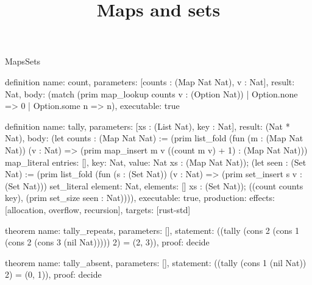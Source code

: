 \begin{lexlean}{MapsSets}
\title{Maps and sets}
\begin{semanticmodule}
definition{
  name: count,
  parameters: [counts : (Map Nat Nat), v : Nat],
  result: Nat,
  body: (match (prim map_lookup counts v : (Option Nat)) | Option.none => 0 | Option.some n => n),
  executable: true
}

definition{
  name: tally,
  parameters: [xs : (List Nat), key : Nat],
  result: (Nat * Nat),
  body: (let counts : (Map Nat Nat) := (prim list_fold (fun (m : (Map Nat Nat)) (v : Nat) => (prim map_insert m v ((count m v) + 1) : (Map Nat Nat))) map_literal{
    entries: [],
    key: Nat,
    value: Nat
  } xs : (Map Nat Nat)); (let seen : (Set Nat) := (prim list_fold (fun (s : (Set Nat)) (v : Nat) => (prim set_insert s v : (Set Nat))) set_literal{
    element: Nat,
    elements: []
  } xs : (Set Nat)); ((count counts key), (prim set_size seen : Nat)))),
  executable: true,
  production: {effects: [allocation, overflow, recursion], targets: [rust-std]}
}

theorem{
  name: tally_repeats,
  parameters: [],
  statement: ((tally (cons 2 (cons 1 (cons 2 (cons 3 (nil Nat))))) 2) = (2, 3)),
  proof: decide{}
}

theorem{
  name: tally_absent,
  parameters: [],
  statement: ((tally (cons 1 (nil Nat)) 2) = (0, 1)),
  proof: decide{}
}
\end{semanticmodule}
\end{lexlean}
